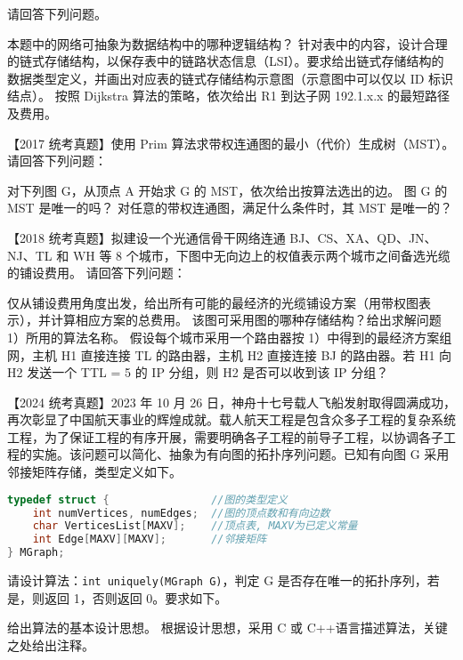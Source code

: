 \begin{qitems}
\begin{bbox}
        请回答下列问题。
        \begin{subqitems}
            \subqitem 本题中的网络可抽象为数据结构中的哪种逻辑结构？
            \subqitem 针对表中的内容，设计合理的链式存储结构，以保存表中的链路状态信息（LSI）。要求给出链式存储结构的数据类型定义，并画出对应表的链式存储结构示意图（示意图中可以仅以 ID 标识结点）。
            \subqitem 按照 Dijkstra 算法的策略，依次给出 R1 到达子网 192.1.x.x 的最短路径及费用。
        \end{subqitems}
    \end{bbox}
    \begin{bbox}
        \qitem 【2017 统考真题】使用 Prim 算法求带权连通图的最小（代价）生成树（MST）。请回答下列问题：
        \begin{subqitems}
            \subqitem 对下列图 G，从顶点 A 开始求 G 的 MST，依次给出按算法选出的边。
            \subqitem 图 G 的 MST 是唯一的吗？
            \subqitem 对任意的带权连通图，满足什么条件时，其 MST 是唯一的？
        \end{subqitems}
    \end{bbox}
    \begin{bbox}
        \qitem 【2018 统考真题】拟建设一个光通信骨干网络连通 BJ、CS、XA、QD、JN、NJ、TL 和 WH 等 8 个城市，下图中无向边上的权值表示两个城市之间备选光缆的铺设费用。
        请回答下列问题：
        \begin{subqitems}
            \subqitem 仅从铺设费用角度出发，给出所有可能的最经济的光缆铺设方案（用带权图表示），并计算相应方案的总费用。
            \subqitem 该图可采用图的哪种存储结构？给出求解问题 1）所用的算法名称。
            \subqitem 假设每个城市采用一个路由器按 1）中得到的最经济方案组网，主机 H1 直接连接 TL 的路由器，主机 H2 直接连接 BJ 的路由器。若 H1 向 H2 发送一个 TTL = 5 的 IP 分组，则 H2 是否可以收到该 IP 分组？
        \end{subqitems}
    \end{bbox}
    \begin{bbox}
        \qitem 【2024 统考真题】2023 年 10 月 26 日，神舟十七号载人飞船发射取得圆满成功，再次彰显了中国航天事业的辉煌成就。载人航天工程是包含众多子工程的复杂系统工程，为了保证工程的有序开展，需要明确各子工程的前导子工程，以协调各子工程的实施。该问题可以简化、抽象为有向图的拓扑序列问题。已知有向图 G 采用邻接矩阵存储，类型定义如下。
        \begin{lstlisting}[language=C, basicstyle=\ttfamily\small]
typedef struct {                //图的类型定义
    int numVertices, numEdges;  //图的顶点数和有向边数
    char VerticesList[MAXV];    //顶点表, MAXV为已定义常量
    int Edge[MAXV][MAXV];       //邻接矩阵
} MGraph;
        \end{lstlisting}
        请设计算法：\lstinline{int uniquely(MGraph G)}，判定 G 是否存在唯一的拓扑序列，若是，则返回 1，否则返回 0。要求如下。
        \begin{subqitems}
            \subqitem 给出算法的基本设计思想。
            \subqitem 根据设计思想，采用 C 或 C++语言描述算法，关键之处给出注释。
        \end{subqitems}
    \end{bbox}
\end{qitems} 